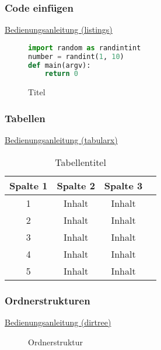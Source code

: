 \subsubsection{Code einfügen}

\href{https://texdoc.org/serve/listings.pdf/0}{Bedienungsanleitung (listings)}

\begin{figure}[!ht]
\begin{lstlisting}[language=Python]
import random as randintint 
number = randint(1, 10)
def main(argv):
    return 0
\end{lstlisting}
\caption[Titel in Abbildungsverzeichnis (Code)]{Titel\footnotemark}
\label{fig:ExampleCode}
\end{figure}
\newpage

\subsubsection{Tabellen}

\href{https://texdoc.org/serve/tabularx/0}{Bedienungsanleitung (tabularx)}

\begin{table}[!ht]
\begin{tabular}{||c c c c||}
\hline
Spalte 1 & Spalte 2 & Spalte 3 \\ [0.5ex]
\hline\hline
1 & Inhalt & Inhalt \\
2 & Inhalt & Inhalt \\
3 & Inhalt & Inhalt \\
4 & Inhalt & Inhalt \\
5 & Inhalt & Inhalt \\ [1ex]
\hline
\end{tabular}
\caption[Tabellenname im Tabellenverzeichnis]{Tabellentitel\footnotemark}
\label{table:ExampleTable}
\end{table}
\newpage

\subsubsection{Ordnerstrukturen}

\href{https://de.mirrors.cicku.me/ctan/macros/generic/dirtree/dirtree.pdf}{Bedienungsanleitung (dirtree)}

\par\medskip
\begin{figure}[!ht]
\caption[Ordnerstruktur im Abbildungsverzeichnis]{Ordnerstruktur}
\label{fig:JSONStruct}
\end{figure}
\newpage

